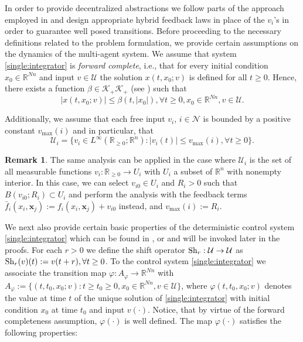 \documentclass[reqno]{amsart}
\theoremstyle{plain}
\theoremstyle{definition}
\newtheorem{rem}[thm]{Remark}
\numberwithin{equation}{section}
\begin{document}
In order to provide decentralized abstractions we follow parts of the approach employed in \cite{BdDd15a} and design appropriate hybrid feedback laws in place of the $v_{i}$'s in order to guarantee well posed transitions. Before proceeding to the necessary definitions related to the problem formulation, we provide certain assumptions on the dynamics of the multi-agent system.
We assume that system \eqref{single:integrator} is \textit{forward complete}, i.e., that for every initial condition $x_0\in{\ensuremath{\mathbb{R}^{{Nn}}}}$ and input $v\in\mathcal{U}$ the solution $x(t,x_0;v)$ is defined for all $t\ge 0$. Hence, there exists a function $\beta\in\mathcal{K}_+\mathcal{K}_+$ (see \cite{Ki05}) such that 
\begin{equation} \label{beta:bound}
|x(t,x_0;v)|\le\beta (t,|x_0|),\forall t\ge 0, x_0\in{\ensuremath{\mathbb{R}^{{Nn}}}},v\in\mathcal{U}.
\end{equation}

\noindent Additionally, we assume that each free input $v_{i}$, $i\in{\ensuremath{\mathcal{N}}}$ is bounded by a positive constant $v_{\max}(i)$ and in particular, that
\begin{equation}\label{input:bound}
{\ensuremath{\mathcal{U}}}_i=\{v_i\in L^{\infty}({\ensuremath{\mathbb{R}_{ \geq 0}}};{\ensuremath{\mathbb{R}^{{n}}}}):|v_{i}(t)|\le v_{\max}(i),\forall t\ge 0\}.
\end{equation}

\begin{rem}
The same analysis can be applied in the case where $\mathcal{U}_i$ is the set of all measurable functions $v_i:{\ensuremath{\mathbb{R}_{ \geq 0}}}\to U_i$ with $U_i$ a subset of ${\ensuremath{\mathbb{R}^{{n}}}}$ with nonempty interior. In this case, we can select $v_{i0}\in U_i$ and $R_i>0$ such that $B(v_{i0};R_i)\subset U_i$ and perform the analysis with the feedback terms $\bar{f}_i(x_i,{\textbf{{x}}}_j):=f_i(x_i,{\textbf{{x}}}_j)+v_{i0}$ instead, and $v_{\max}(i):=R_i$.
\end{rem}

\noindent We next also provide certain basic properties of the deterministic control system \eqref{single:integrator} which can be found in \cite[Chapter 1]{KiJj11}, or \cite[Chapter 2]{Se98} and will be invoked later in the proofs. For each $r>0$ we define the shift operator ${\rm Sh}_r:\mathcal{U}\to\mathcal{U}$ as $
{\rm Sh}_r(v)(t):=v(t+r),\forall t\ge 0$. To the control system \eqref{single:integrator} we associate the transition map $\varphi:A_{\varphi}\to {\ensuremath{\mathbb{R}^{{Nn}}}}$ with $A_{\varphi}:=\{(t,t_0,x_0;v):t\ge t_0\ge 0,x_0\in {\ensuremath{\mathbb{R}^{{Nn}}}},v\in\mathcal{U}\}$, where $\varphi(t,t_0,x_0;v)$ denotes the value at time $t$ of the unique solution of \eqref{single:integrator} with initial condition $x_0$ at time $t_0$ and input $v(\cdot)$. Notice, that by virtue of the forward completeness assumption, $\varphi(\cdot)$ is well defined. The map $\varphi(\cdot)$ satisfies the following properties:
\end{document}
